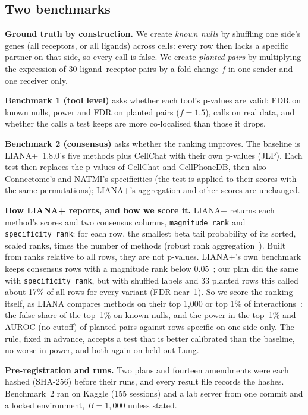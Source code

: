 \documentclass[11pt]{article}
\newcommand{\JLP}{JLP}
\begin{document}
\subsection{Two benchmarks}
\textbf{Ground truth by construction.} We create \emph{known nulls} by shuffling one side's genes (all receptors, or
all ligands) across cells: every row then lacks a specific partner on that side, so every call is false. We create
\emph{planted pairs} by multiplying the expression of 30 ligand--receptor pairs by a fold change $f$ in one sender and
one receiver only.

\textbf{Benchmark 1 (tool level)} asks whether each tool's p-values are valid: FDR on known nulls, power and FDR on
planted pairs ($f=1.5$), calls on real data, and whether the calls a test keeps are more co-localised than those it
drops.

\textbf{Benchmark 2 (consensus)} asks whether the ranking improves. The baseline is LIANA+~1.8.0's five methods plus
CellChat with their own p-values (\JLP). Each test then replaces the p-values of CellChat and CellPhoneDB, then also
Connectome's and NATMI's specificities (the test is applied to their scores with the same permutations); LIANA+'s
aggregation and other scores are unchanged.

\textbf{How LIANA+ reports, and how we score it.} LIANA+ returns each method's scores and two consensus columns,
\texttt{magnitude\_rank} and \texttt{specificity\_rank}: for each row, the smallest beta tail probability of its sorted,
scaled ranks, times the number of methods (robust rank aggregation~\cite{kolde2012}). Built from ranks relative to all
rows, they are not p-values. LIANA+'s own benchmark keeps consensus rows with a magnitude rank below 0.05~\cite{dimitrov2024}; our
plan did the same with \texttt{specificity\_rank}, but with shuffled labels and 33 planted rows this called about 17\%
of all rows for every variant (FDR near~1). So we score the ranking itself, as LIANA compares methods on their top
1{,}000 or top 1\% of interactions~\cite{dimitrov2022}: the false share of the top~1\% on known nulls, and the power in
the top~1\% and AUROC (no cutoff) of planted pairs against rows specific on one side only. The rule, fixed in advance,
accepts a test that is better calibrated than the baseline, no worse in power, and both again on held-out Lung.

\textbf{Pre-registration and runs.} Two plans and fourteen amendments were each hashed (SHA-256) before their runs, and
every result file records the hashes. Benchmark~2 ran on Kaggle (155 sessions) and a lab server from one commit and a
locked environment, $B=1{,}000$ unless stated.
\end{document}

